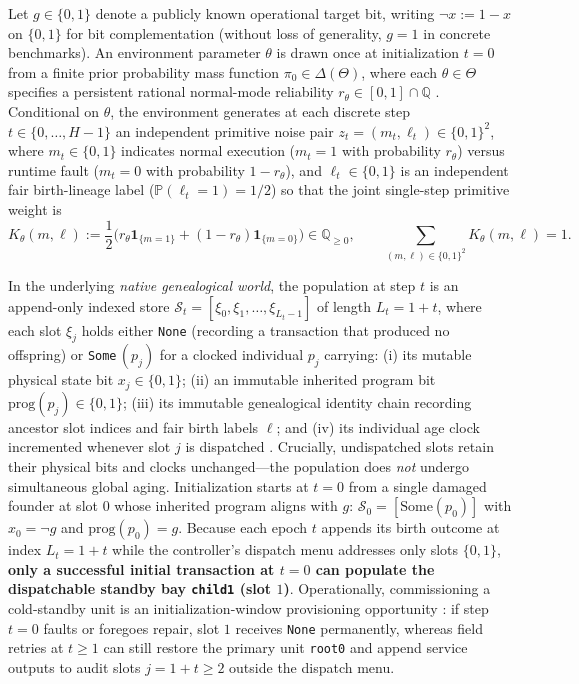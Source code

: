 \documentclass[11pt,a4paper]{article}
\begin{document}
Let \(g \in \{0,1\}\) denote a publicly known operational target bit,
writing \(\neg x := 1 - x\) on \(\{0,1\}\) for bit complementation
(without loss of generality, \(g = 1\) in concrete benchmarks). An
environment parameter \(\theta\) is drawn once at initialization
\(t = 0\) from a finite prior probability mass function
\(\pi_0 \in \Delta(\Theta)\), where each \(\theta \in \Theta\) specifies
a persistent rational normal-mode reliability
\(r_\theta \in [0,1] \cap \mathbb{Q}\)
\citep{wald1950, savage1954, rieder1975}. Conditional on \(\theta\), the
environment generates at each discrete step \(t \in \{0, \dots, H-1\}\)
an independent primitive noise pair
\(z_t = (m_t, \ell_t) \in \{0,1\}^2\), where \(m_t \in \{0,1\}\)
indicates normal execution (\(m_t = 1\) with probability \(r_\theta\))
versus runtime fault (\(m_t = 0\) with probability \(1 - r_\theta\)),
and \(\ell_t \in \{0,1\}\) is an independent fair birth-lineage label
(\(\mathbb{P}(\ell_t = 1) = 1/2\)) so that the joint single-step
primitive weight is
\[K_\theta(m, \ell) := \frac{1}{2}\bigl(r_\theta \mathbf{1}_{\{m=1\}} + (1 - r_\theta)\mathbf{1}_{\{m=0\}}\bigr) \in \mathbb{Q}_{\ge 0}, \qquad \sum_{(m,\ell) \in \{0,1\}^2} K_\theta(m, \ell) = 1.\]

In the underlying \emph{native genealogical world}, the population at
step \(t\) is an append-only indexed store
\(\mathcal{S}_t = [\xi_0, \xi_1, \dots, \xi_{L_t - 1}]\) of length
\(L_t = 1 + t\), where each slot \(\xi_j\) holds either \texttt{None}
(recording a transaction that produced no offspring) or
\texttt{Some}\(\,(p_j)\) for a clocked individual \(p_j\) carrying: (i)
its mutable physical state bit \(x_j \in \{0,1\}\); (ii) an immutable
inherited program bit \(\mathrm{prog}(p_j) \in \{0,1\}\); (iii) its
immutable genealogical identity chain recording ancestor slot indices
and fair birth labels \(\ell\); and (iv) its individual age clock
incremented whenever slot \(j\) is dispatched
\citep{jagers1975, haccou2005}. Crucially, undispatched slots retain
their physical bits and clocks unchanged---the population does
\emph{not} undergo simultaneous global aging. Initialization starts at
\(t = 0\) from a single damaged founder at slot \(0\) whose inherited
program aligns with \(g\): \(\mathcal{S}_0 = [\mathrm{Some}(p_0)]\) with
\(x_0 = \neg g\) and \(\mathrm{prog}(p_0) = g\). Because each epoch
\(t\) appends its birth outcome at index \(L_t = 1 + t\) while the
controller's dispatch menu addresses only slots \(\{0, 1\}\),
\textbf{only a successful initial transaction at \(t = 0\) can populate
the dispatchable standby bay \texttt{child1} (slot \(1\))}.
Operationally, commissioning a cold-standby unit is an
initialization-window provisioning opportunity
\citep{barlowProschan1975}: if step \(t = 0\) faults or foregoes repair,
slot \(1\) receives \texttt{None} permanently, whereas field retries at
\(t \ge 1\) can still restore the primary unit \texttt{root0} and append
service outputs to audit slots \(j = 1 + t \ge 2\) outside the dispatch
menu.
\end{document}

